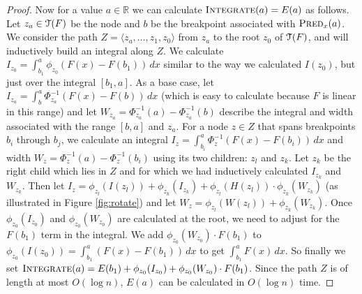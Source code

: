 \documentclass[11pt]{article}
\def\pred{\mathop{\text{\sc Predecessor}}}
\def\TT{\EuScript{T}}
\def\integrate{\mathop{\textsc{Integrate}}}
\def\pred{\mathop{\textsc{Pred}}}
\renewcommand{\b}[1]{\ensuremath{\mathbb{#1}}}
\begin{document}
\begin{proof}
Now for a value $a \in \b{R}$ we can calculate $\integrate(a) = E(a)$ as follows.  
Let $z_a \in \TT(F)$ be the node and $b$ be the breakpoint associated with $\pred_x(a)$.  We consider the path $Z = \langle z_a, \ldots, z_1, z_0\rangle$ from $z_a$ to the root $z_0$ of $\TT(F)$, and will inductively build an integral along $Z$.  
We calculate $I_{z_0} = \int_{b_1}^a \phi_{z_0}(F(x) - F(b_1)) \, dx$ similar to the way we calculated $I(z_0)$, but just over the integral $[b_1, a]$.  
As a base case, let $I_{z_a} = \int_{b}^{a} \Phi_{z_a}^{-1}(F(x)-F(b)) \, dx$ (which is easy to calculate because $F$ is linear in this range) and let $W_{z_a} = \Phi_{z_a}^{-1}(a)-\Phi_{z_a}^{-1}(b)$ describe the integral and width associated with the range $[b,a]$ and $z_a$.  
For a node $z \in Z$ that spans breakpoints $b_i$ through $b_j$, we calculate an integral $I_z = \int_{b_i}^a \Phi_z^{-1}(F(x)-F(b_i)) \, dx$ and width $W_z = \Phi_z^{-1}(a) - \Phi_z^{-1}(b_i)$ using its two children: $z_l$ and $z_k$.  Let $z_k$ be the right child which lies in $Z$ and for which we had inductively calculated $I_{z_k}$ and $W_{z_k}$.  
Then let $I_z = \phi_{z_l}(I(z_l)) + \phi_{z_k}(I_{z_k}) + \phi_{z_l}(H(z_l)) \cdot \phi_{z_k}(W_{z_k})$ (as illustrated in Figure \ref{fig:rotate}) and let $W_z = \phi_{z_l}(W(z_l)) + \phi_{z_k}(W_{z_k})$.  
Once $\phi_{z_0}(I_{z_0})$ and $\phi_{z_0}(W_{z_0})$ are calculated at the root, we need to adjust for the $F(b_1)$ term in the integral.  We add $\phi_{z_0}(W_{z_0})\cdot F(b_1)$ to $\phi_{z_0}(I(z_0)) = \int_{b_1}^a (F(x) - F(b_1)) \, dx$ to get $\int_{b_1}^a F(x) \, dx$.
So finally we set $\integrate(a) =  E(b_1) + \phi_{z_0}(I_{z_0}) + \phi_{z_0}(W_{z_0}) \cdot F(b_1)$.  
Since the path $Z$ is of length at most $O(\log n)$, $E(a)$ can be calculated in $O(\log n)$ time. 
\end{proof}
\end{document}
